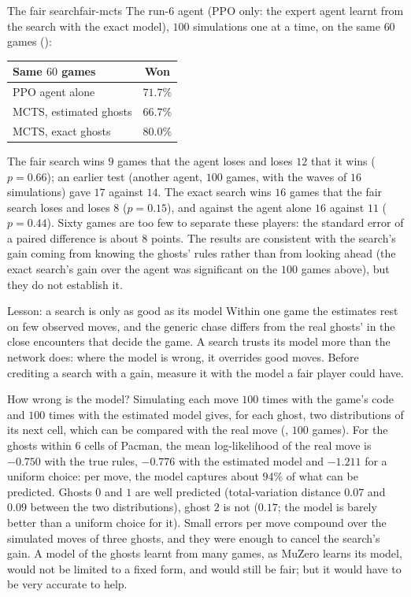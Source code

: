 \begin{pacman}{The fair search}{fair-mcts}
  The run-6 agent (PPO only: the expert agent learnt from the search with
  the exact model), $100$ simulations one at a time, on the same $60$ games
  ():
  \begin{center}
    \begin{tabular}{@{}lc@{}}
      \toprule
      Same $60$ games & Won \\
      \midrule
      PPO agent alone & $71.7\%$ \\
      MCTS, estimated ghosts & $66.7\%$ \\
      MCTS, exact ghosts & $80.0\%$ \\
      \bottomrule
    \end{tabular}
  \end{center}
  The fair search wins $9$ games that the agent loses and loses $12$ that
  it wins ($p = 0.66$); an earlier test (another agent, $100$ games, with
  the waves of $16$ simulations) gave $17$ against $14$. The exact search
  wins $16$ games that the fair search loses and loses $8$ ($p = 0.15$),
  and against the agent alone $16$ against $11$ ($p = 0.44$). Sixty games
  are too few to separate these players: the standard error of a paired
  difference is about $8$ points. The results are consistent with the
  search's gain coming from knowing the ghosts' rules rather than from
  looking ahead (the exact search's gain over the agent was significant on
  the $100$ games above), but they do not establish it.
\end{pacman}

\begin{remark}{Lesson: a search is only as good as its model}{}
  Within one game the estimates rest on few observed moves, and the generic
  chase differs from the real ghosts' in the close encounters that decide
  the game. A search trusts its model more than the network does: where the
  model is wrong, it overrides good moves. Before crediting a search with a
  gain, measure it with the model a fair player could have.
\end{remark}

How wrong is the model? Simulating each move $100$ times with the game's
code and $100$ times with the estimated model gives, for each ghost, two
distributions of its next cell, which can be compared with the real move
(, $100$ games). For the ghosts within $6$
cells of Pacman, the mean log-likelihood of the real move is $-0.750$ with
the true rules, $-0.776$ with the estimated model and $-1.211$ for a uniform
choice: per move, the model captures about $94\%$ of what can be predicted.
Ghosts $0$ and $1$ are well predicted (total-variation distance $0.07$ and
$0.09$ between the two distributions), ghost $2$ is not ($0.17$; the model
is barely better than a uniform choice for it). Small errors per move
compound over the simulated moves of three ghosts, and they were enough to
cancel the search's gain. A model of the ghosts learnt from many games, as
MuZero learns its model, would not be limited to a fixed form, and would
still be fair; but it would have to be very accurate to help.

